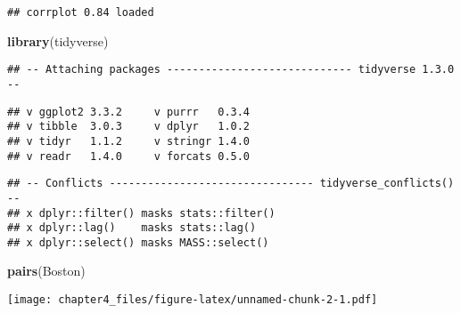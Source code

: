 \documentclass[
]{article}
\newenvironment{Shaded}{\begin{snugshade}}{\end{snugshade}}
\newcommand{\CommentTok}[1]{\textcolor[rgb]{0.56,0.35,0.01}{\textit{#1}}}
\newcommand{\DecValTok}[1]{\textcolor[rgb]{0.00,0.00,0.81}{#1}}
\newcommand{\KeywordTok}[1]{\textcolor[rgb]{0.13,0.29,0.53}{\textbf{#1}}}
\newcommand{\NormalTok}[1]{#1}
\newcommand{\OperatorTok}[1]{\textcolor[rgb]{0.81,0.36,0.00}{\textbf{#1}}}
\begin{document}
\begin{Shaded}
\end{Shaded}

\begin{verbatim}
## corrplot 0.84 loaded
\end{verbatim}

\begin{Shaded}
\begin{Highlighting}[]
\KeywordTok{library}\NormalTok{(tidyverse)}
\end{Highlighting}
\end{Shaded}

\begin{verbatim}
## -- Attaching packages ----------------------------- tidyverse 1.3.0 --
\end{verbatim}

\begin{verbatim}
## v ggplot2 3.3.2     v purrr   0.3.4
## v tibble  3.0.3     v dplyr   1.0.2
## v tidyr   1.1.2     v stringr 1.4.0
## v readr   1.4.0     v forcats 0.5.0
\end{verbatim}

\begin{verbatim}
## -- Conflicts -------------------------------- tidyverse_conflicts() --
## x dplyr::filter() masks stats::filter()
## x dplyr::lag()    masks stats::lag()
## x dplyr::select() masks MASS::select()
\end{verbatim}

\begin{Shaded}
\begin{Highlighting}[]
\KeywordTok{pairs}\NormalTok{(Boston)}
\end{Highlighting}
\end{Shaded}

\texttt{[image: chapter4\_files/figure-latex/unnamed-chunk-2-1.pdf]}

\begin{Shaded}
\end{Shaded}
\end{document}
